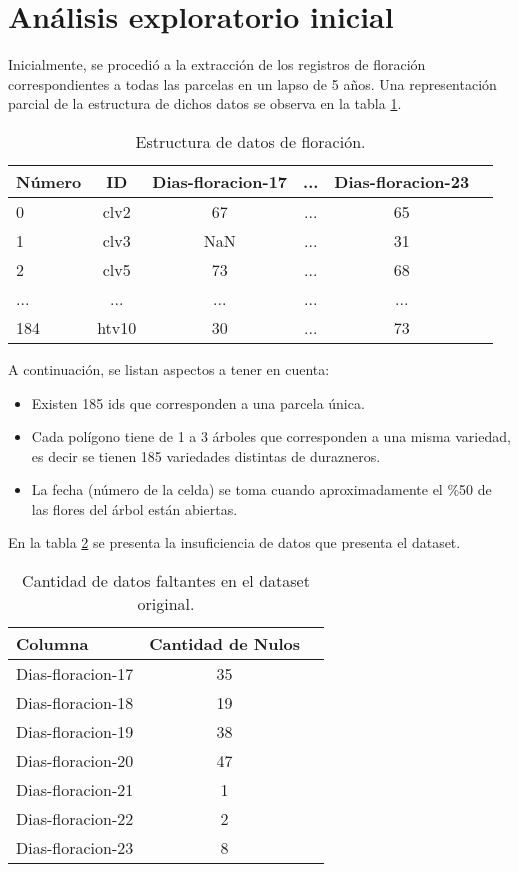 \section{Análisis exploratorio inicial}

Inicialmente, se procedió a la extracción de los registros de floración correspondientes 
a todas las parcelas en un lapso de 5 años. Una representación parcial de la 
estructura de dichos datos se observa en la tabla \ref{tab:firstdataset}.

	\begin{table}[h]
		\centering
		\caption{Estructura de datos de floración.}
		\begin{tabular}{l c c c c c}    
			\toprule
			\textbf{Número} & \textbf{ID} & \textbf{Dias-floracion-17} & \textbf{...} & \textbf{Dias-floracion-23} \\
			\midrule
			0 & clv2 & 67 & ... & 65 \\		
			1 & clv3 & NaN & ... & 31 \\
			2 & clv5 & 73 & ... & 68 \\
      ... & ... & ... & ... & ... \\
      184 & htv10 & 30 & ... & 73 \\
			\bottomrule
		\end{tabular}
		\label{tab:firstdataset}
	\end{table}

A continuación, se listan aspectos a tener en cuenta:
\begin{itemize}
  \item Existen 185 ids que corresponden a una parcela única.
  \item Cada polígono tiene de 1 a 3 árboles que corresponden a una misma variedad, es decir se tienen 185 variedades distintas
   de durazneros.
  \item La fecha (número de la celda) se toma cuando aproximadamente el \%50 de las flores del árbol están abiertas. 
 \end{itemize} 

En la tabla \ref{tab:nullsdataset} se presenta la insuficiencia de datos que presenta el dataset.

\begin{table}[h]
  \centering
  \caption{Cantidad de datos faltantes en el dataset original.}
  \begin{tabular}{l c c}    
    \toprule
     \textbf{Columna} & \textbf{Cantidad de Nulos} \\
    \midrule
    Dias-floracion-17 & 35 \\		
    Dias-floracion-18	 & 19  \\
    Dias-floracion-19	& 38  \\
    Dias-floracion-20	 & 47 \\
    Dias-floracion-21	 & 1 \\
    Dias-floracion-22	 & 2 \\
    Dias-floracion-23	 & 8 \\
    \bottomrule
  \end{tabular}
  \label{tab:nullsdataset}
\end{table}


